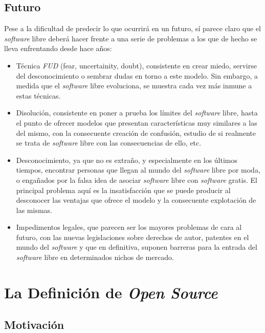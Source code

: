 \subsection{Futuro}

Pese a la dificultad de predecir lo que ocurrirá en un futuro, sí parece claro
que el \textit{software} libre deberá hacer frente a una serie de problemas a
los que de hecho se lleva enfrentando desde hace años:

\begin{itemize}
  \item Técnica \textit{FUD} (fear, uncertainity, doubt), consistente en crear
miedo, servirse del desconocimiento o sembrar dudas en torno a este modelo. Sin
embargo, a medida que el \textit{software} libre evoluciona, se muestra cada vez
más inmune a estas técnicas.
  \item Disolución, consistente en poner a prueba los límites del
\textit{software} libre, hasta el punto de ofrecer modelos que presentan
características muy similares a las del mismo, con la consecuente creación de
confusión, estudio de si realmente se trata de \textit{software} libre con las
consecuencias de ello, etc.
  \item Desconocimiento, ya que no es extraño, y especialmente en los últimos
tiempos, encontrar personas que llegan al mundo del \textit{software} libre por
moda, o engañados por la falsa idea de asociar \textit{software} libre con
\textit{software} gratis. El principal problema aquí es la insatisfacción que se
puede producir al desconocer las ventajas que ofrece el modelo y la consecuente
explotación de las mismas.
  \item Impedimentos legales, que parecen ser los mayores problemas de cara al
futuro, con las nuevas legislaciones sobre derechos de autor, patentes en el
mundo del \textit{software} y que en definitiva, suponen barreras para la
entrada del \textit{software} libre en determinados nichos de mercado.
\end{itemize}

\section{La Definición de \textit{Open Source}}

\subsection{Motivación}
\label{SUBSEC:DefinicionMotivacion}

